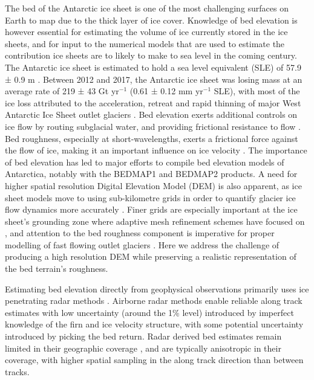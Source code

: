 \documentclass[tc, manuscript]{copernicus}
\begin{document}
The bed of the Antarctic ice sheet is one of the most challenging surfaces on Earth to map due to the thick layer of ice cover.
Knowledge of bed elevation is however essential for estimating the volume of ice currently stored in the ice sheets, and for input to the numerical models that are used to estimate the contribution ice sheets are to likely to make to sea level in the coming century.
The Antarctic ice sheet is estimated to hold a sea level equivalent (SLE) of 57.9 ± 0.9 m \citep{MorlighemDeepglacialtroughs2019}.
Between 2012 and 2017, the Antarctic ice sheet was losing mass at an average rate of 219 ± 43 Gt yr$^{-1}$ (0.61 ± 0.12 mm yr$^{-1}$ SLE), with most of the ice loss attributed to the acceleration, retreat and rapid thinning of major West Antarctic Ice Sheet outlet glaciers \citep{IMBIEMassbalanceAntarctic2018}.
Bed elevation exerts additional controls on ice flow by routing subglacial water, and providing frictional resistance to flow \citep{SiegertMacroscalebedroughness2004}.
Bed roughness, especially at short-wavelengths, exerts a frictional force against the flow of ice, making it an important influence on ice velocity \citep{BinghamDiverselandscapesPine2017,FalciniQuantifyingbedroughness2018}.
The importance of bed elevation has led to major efforts to compile bed elevation models of Antarctica, notably with the BEDMAP1 \citep{LytheBEDMAPnewice2001} and BEDMAP2 \citep{FretwellBedmap2improvedice2013} products.
A need for higher spatial resolution Digital Elevation Model (DEM) is also apparent, as ice sheet models move to using sub-kilometre grids in order to quantify glacier ice flow dynamics more accurately \citep{LeBrocqimprovedAntarcticdataset2010,Grahamhighresolutionsyntheticbed2017}.
Finer grids are especially important at the ice sheet's grounding zone where adaptive mesh refinement schemes have focused on \citep[e.g.][]{CornfordAdaptivemeshrefinement2016}, and attention to the bed roughness component is imperative for proper modelling of fast flowing outlet glaciers \citep{DurandImpactbedrockdescription2011,NiasContrastingmodelledsensitivity2016}.
Here we address the challenge of producing a high resolution DEM while preserving a realistic representation of the bed terrain's roughness.

Estimating bed elevation directly from geophysical observations primarily uses ice penetrating radar methods \citep[e.g.][]{RobinRadioechoexploration1970}.
Airborne radar methods enable reliable along track estimates with low uncertainty (around the 1\% level) introduced by imperfect knowledge of the firn and ice velocity structure, with some potential uncertainty introduced by picking the bed return.
Radar derived bed estimates remain limited in their geographic coverage \citep{FretwellBedmap2improvedice2013}, and are typically anisotropic in their coverage, with higher spatial sampling in the along track direction than between tracks.
\end{document}
